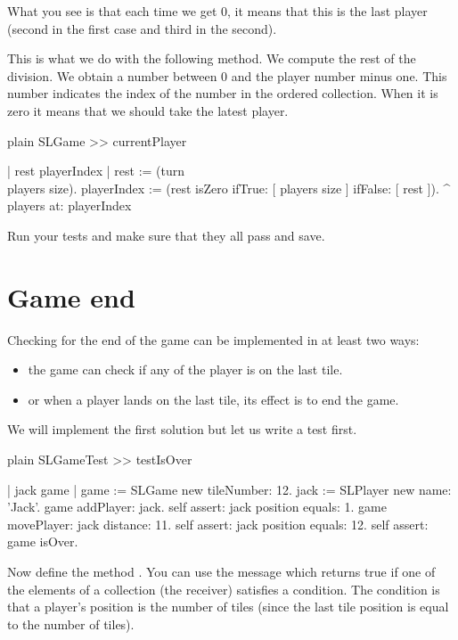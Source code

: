 \documentclass[10pt,twoside,english]{_support/latex/sbabook/sbabook}
\begin{document}
What you see is that each time we get 0, it means that this is the last player (second in the first case and third in the second).

This is what we do with the following method. We compute the rest of the division. 
We obtain a number between 0 and the player number minus one. This number indicates the index of the number in the  ordered collection. When it is zero it means that we should take the latest player. 

\begin{displaycode}{plain}
SLGame >> currentPlayer

	| rest playerIndex |
	rest := (turn \\ players size).
	playerIndex := (rest isZero
					ifTrue: [ players size ]
					ifFalse: [ rest ]).
	^ players at: 	playerIndex
\end{displaycode}

Run your tests and make sure that they all pass and save.
\section{Game end}
Checking for the end of the game can be implemented in at least two ways: 

\begin{itemize}
\item the game can check if any of the player is on the last tile.
\item or when a player lands on the last tile, its effect is to end the game. 
\end{itemize}

We will implement the first solution but let us write a test first.

\begin{displaycode}{plain}
SLGameTest >> testIsOver
	
	| jack game |
	game := SLGame new tileNumber: 12.
	jack := SLPlayer new name: 'Jack'.
	game addPlayer: jack. 
	self assert: jack position equals: 1. 
	game movePlayer: jack distance: 11.
	self assert: jack position equals: 12.
	self assert: game isOver.
\end{displaycode}

Now define the method . You can use the  message which returns true if one of the elements of a collection (the receiver) satisfies a condition. The condition is that a player's position is the number of tiles (since the last tile position is equal to the number of tiles).
\end{document}
